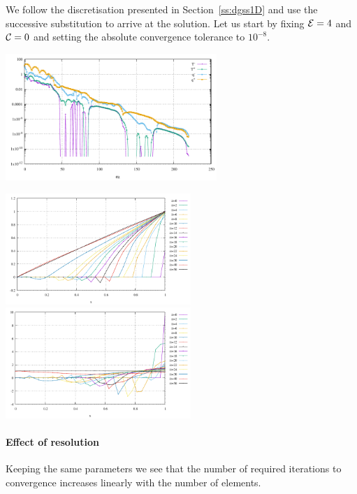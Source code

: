 
We follow the discretisation presented in Section~\ref{ss:dgss1D} and use the 
successive substitution to arrive at the solution. 
Let us start by fixing ${\cal E}=4$ and ${\cal C}=0$ and setting the absolute convergence 
tolerance to $10^{-8}$.

\begin{center}
\includegraphics[width=8cm]{python_codes/fieldstone_57/results/E04_C000/convergence.pdf}
\end{center}

\begin{center}
\includegraphics[width=7cm]{python_codes/fieldstone_57/results/E04_C000/T_minus_evol.pdf}
\includegraphics[width=7cm]{python_codes/fieldstone_57/results/E04_C000/q_minus_evol.pdf}
\end{center}

\paragraph{Effect of resolution} Keeping the same parameters we see that the 
number of required iterations to convergence increases linearly with the number of elements.

